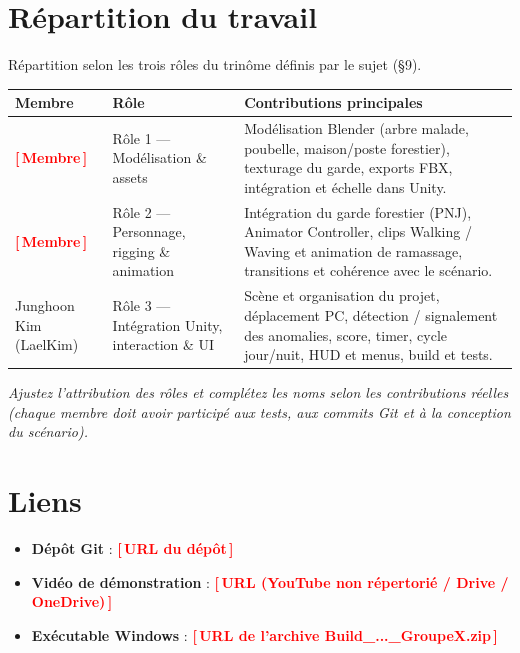 \documentclass[11pt,a4paper]{article}
\newcommand{\todo}[1]{\textcolor{red}{\textbf{[\,#1\,]}}}
\begin{document}
\section{Répartition du travail}
Répartition selon les trois rôles du trinôme définis par le sujet (§9).
\begin{center}
\begin{tabularx}{\linewidth}{@{}p{3.2cm}p{3.4cm}X@{}}
\toprule
\textbf{Membre} & \textbf{Rôle} & \textbf{Contributions principales} \\
\midrule
\todo{Membre} & Rôle 1 --- Modélisation \& assets &
Modélisation Blender (arbre malade, poubelle, maison/poste forestier),
texturage du garde, exports FBX, intégration et échelle dans Unity. \\
\addlinespace
\todo{Membre} & Rôle 2 --- Personnage, rigging \& animation &
Intégration du garde forestier (PNJ), Animator Controller, clips Walking / Waving
et animation de ramassage, transitions et cohérence avec le scénario. \\
\addlinespace
Junghoon Kim (LaelKim) & Rôle 3 --- Intégration Unity, interaction \& UI &
Scène et organisation du projet, déplacement PC, détection / signalement des
anomalies, score, timer, cycle jour/nuit, HUD et menus, build et tests. \\
\bottomrule
\end{tabularx}
\end{center}
\noindent\textit{Ajustez l'attribution des rôles et complétez les noms selon les
contributions réelles (chaque membre doit avoir participé aux tests, aux commits
Git et à la conception du scénario).}

\section{Liens}
\begin{itemize}
  \item \textbf{Dépôt Git} : \todo{URL du dépôt}
  \item \textbf{Vidéo de démonstration} : \todo{URL (YouTube non répertorié / Drive / OneDrive)}
  \item \textbf{Exécutable Windows} : \todo{URL de l'archive Build\_...\_GroupeX.zip}
\end{itemize}

\end{document}
